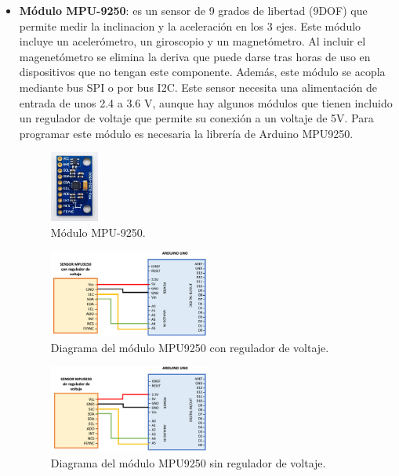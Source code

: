 \begin{itemize}
    \item \textbf{Módulo MPU-9250}: es un sensor de 9 grados de libertad (9DOF) que permite medir la inclinacion y la aceleración en los 3 ejes. Este módulo incluye un acelerómetro, un giroscopio y un magnetómetro. Al incluir el magenetómetro se elimina la deriva que puede darse tras horas de uso en dispositivos que no tengan este componente. Además, este módulo se acopla mediante bus SPI o por bus I2C. Este sensor necesita una alimentación de entrada de unos 2.4 a 3.6 V, aunque hay algunos módulos que tienen incluido un regulador de voltaje que permite su conexión a un voltaje de 5V. Para programar este módulo es necesaria la librería de Arduino MPU9250.
\begin{figure}[h!]
    \centering
    \includegraphics[width=0.15\textwidth]{img/imgMPU9250.jpg}
    \caption{Módulo MPU-9250\cite{imgMPU9250}.}
    \label{fig:imgMPU9250} %
\end{figure}

\begin{figure}[h!]
    \centering
    \includegraphics[width=0.5\textwidth]{img/MPU9250Regulador.png}
    \caption{Diagrama del módulo MPU9250 con regulador de voltaje.}
    \label{fig:MPU9250R} %
\end{figure}
\begin{figure}[h!]
    \centering
    \includegraphics[width=0.5\textwidth]{img/MPU9250SinRegulador.png}
    \caption{Diagrama del módulo MPU9250 sin regulador de voltaje.}
    \label{fig:MPU9250} %
\end{figure}

\end{itemize}



